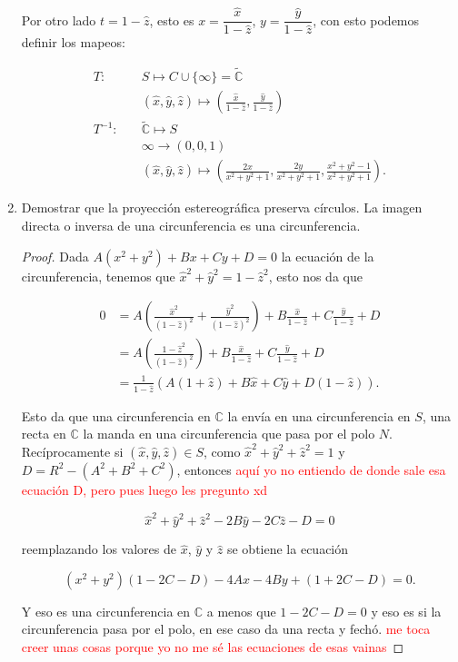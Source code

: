 \documentclass[11pt]{article}
\begin{document}
\begin{enumerate}
Por otro lado $t=1-\hat{z}$, esto es $x=\dfrac{\hat{x}}{1-\hat{z}}$, $y=\dfrac{\hat{y}}{1-\hat{z}}$, con esto podemos definir los mapeos:

\begin{align*}
    T:\quad&S\mapsto C\cup \{\infty\}=\widetilde{\mathbb{C}}\\
    &(\hat{x},\hat{y},\hat{z})\mapsto\left(\frac{\hat{x}}{1-\hat{z}},\frac{\hat{y}}{1-\hat{z}}\right)\\
    T^{-1}:\quad&\widetilde{\mathbb{C}}\mapsto S\\
    &\infty\to (0,0,1)\\
    &(\hat{x},\hat{y},\hat{z})\mapsto\left(\frac{2x}{x^2+y^2+1},\frac{2y}{x^2+y^2+1},\frac{x^2+y^2-1}{x^2+y^2+1}\right)
.\end{align*}

    \item Demostrar que la proyección estereográfica preserva círculos. La imagen directa o inversa de una circunferencia es una circunferencia.

    \begin{proof}
   Dada $A(x^2+y^2)+Bx+Cy+D=0$ la ecuación de la circunferencia, tenemos que $\hat{x}^2+\hat{y}^2=1-\hat{z}^2$, esto nos da que

   \begin{align*}
       0&=A\left(\frac{\hat{x}^2}{(1-\hat{z})^2}+\frac{\hat{y}^2}{(1-\hat{z})^2}\right)+B\frac{\hat{x}}{1-\hat{z}}+C\frac{\hat{y}}{1-\hat{z}}+D\\
       &=A\left(\frac{1-\hat{z}^2}{(1-\hat{z})^2}\right)+B\frac{\hat{x}}{1-\hat{z}}+C\frac{\hat{y}}{1-\hat{z}}+D\\
       &=\frac{1}{1-\hat{z}}\left(A(1+\hat{z})+B\hat{x}+C\hat{y}+D(1-\hat{z})\right)
   .\end{align*}

   Esto da que una circunferencia en $\mathbb{C}$ la envía en una circunferencia en $S$, una recta en $\mathbb{C}$ la manda en una circunferencia que pasa por el polo $N$. Recíprocamente si $(\hat{x},\hat{y},\hat{z})\in  S$, como $\hat{x}^2+\hat{y}^2+\hat{z}^2=1$ y $D=R^2-(A^2+B^2+C^2)$, entonces \textcolor{red}{aquí yo no entiendo de donde sale esa ecuación D, pero pues luego les pregunto xd}

   $$\hat{x}^2+\hat{y}^2+\hat{z}^2-2B\hat{y}-2C\hat{z}-D=0$$

   reemplazando los valores de $\hat{x}$, $\hat{y}$ y $\hat{z}$ se obtiene la ecuación 

   $$
\left(x^2+y^2\right)(1-2C-D)-4 A x-4 B y+(1+2 C-D)=0 .
$$

Y eso es una circunferencia en $\mathbb{C}$ a menos que $1-2C-D=0$ y eso es si la circunferencia pasa por el polo, en ese caso da una recta y fechó. \textcolor{red}{me toca creer unas cosas porque yo no me sé las ecuaciones de esas vainas}
\end{proof}

\end{enumerate}
\end{document}
